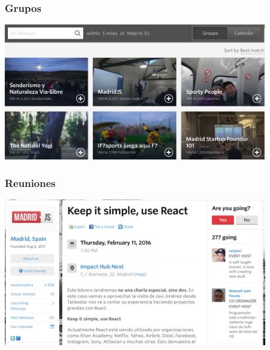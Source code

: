 \begin{frame}
\frametitle{Grupos}

\includegraphics[width=11.5cm]{figs/meetup-near-madrid} 

\end{frame}

\begin{frame}
\frametitle{Reuniones}

\includegraphics[width=11.5cm]{figs/meetup-meeting} 

\end{frame}
